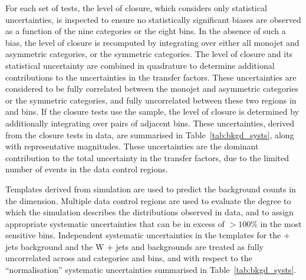 For each set of tests, the level of closure, which considers only
statistical uncertainties, is inspected to ensure no statistically
significant biases are observed as a function of the nine \njet
categories or the eight \scalht bins. In the absence of such a bias,
the level of closure is recomputed by integrating over either all
monojet and asymmetric \njet categories, or the symmetric \njet
categories. The level of closure and its statistical uncertainty are
combined in quadrature to determine additional contributions to the
uncertainties in the transfer factors. These uncertainties are
considered to be fully correlated between the monojet and asymmetric
\njet categories or the symmetric \njet categories, and fully
uncorrelated between these two regions in \njet and \scalht bins. If
the closure tests use the \mmj sample, the level of closure is
determined by additionally integrating over pairs of adjacent \scalht
bins. These uncertainties, derived from the closure tests in data, are
summarised in Table~\ref{tab:bkgd_systs}, along with representative
magnitudes. These uncertainties are the dominant contribution to the
total uncertainty in the transfer factors, due to the limited number
of events in the data control regions.

Templates derived from simulation are used to predict the background
counts in the \mht dimension. Multiple data control regions are used
to evaluate the degree to which the simulation describes the \mht
distributions observed in data, and to assign appropriate systematic
uncertainties that can be in excess of $>100\%$ in the most sensitive
\mht bins. Independent systematic uncertainties in the templates for
the \znunu + jets background and the W + jets and \ttbar backgrounds
are treated as fully uncorrelated across \njet and \nb categories and
\scalht bins, and with respect to the ``normalisation'' systematic
uncertainties summarised in Table~\ref{tab:bkgd_systs}.

